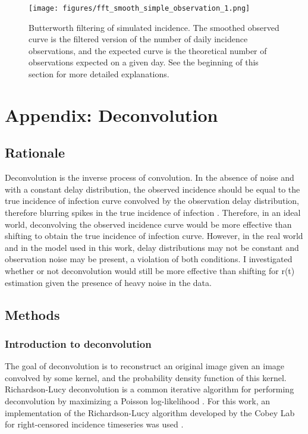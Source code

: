 \documentclass{article}
\begin{document}
{\clearpage
\begin{figure}[h!]
    \centering
    \texttt{[image: figures/fft\_smooth\_simple\_observation\_1.png]}
    \caption{Butterworth filtering of simulated incidence. The smoothed observed curve is the filtered version of the number of daily incidence observations, and the expected curve is the theoretical number of observations expected on a given day. See the beginning of this section for more detailed explanations.}
\end{figure}



\section{Appendix: Deconvolution}
\subsection{Rationale}
Deconvolution is the inverse process of convolution. In the absence of noise and with a constant delay distribution, the observed incidence should be equal to the true incidence of infection curve convolved by the observation delay distribution, therefore blurring spikes in the true incidence of infection \cite{Gostic}. Therefore, in an ideal world, deconvolving the observed incidence curve would be more effective than shifting to obtain the true incidence of infection curve. However, in the real world and in the model used in this work, delay distributions may not be constant and observation noise may be present, a violation of both conditions. I investigated whether or not deconvolution would still be more effective than shifting for r(t) estimation given the presence of heavy noise in the data.

\subsection{Methods}
\subsubsection{Introduction to deconvolution}
The goal of deconvolution is to reconstruct an original image given an image convolved by some kernel, and the probability density function of this kernel. Richardson-Lucy deconvolution is a common iterative algorithm for performing deconvolution by maximizing a Poisson log-likelihood \cite{RLLoss}. For this work, an implementation of the Richardson-Lucy algorithm developed by the Cobey Lab for right-censored incidence timeseries was used \cite{Gostic}.

}
\end{document}
